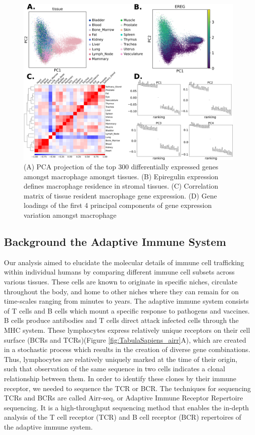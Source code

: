 \begin{figure}[hbt!]
\centering
\includegraphics[width=14cm, keepaspectratio]{figs/TabulaSapiens/fig1_gex_analysis.png}
\caption[Gene Expression Analysis of Tissue Resident Macrophage]{(A) PCA projection of the top 300 differentially expressed genes amongst macrophage amongst tissues. (B) Epiregulin expression defines macrophage residence in stromal tissues. (C) Correlation matrix of tissue resident macrophage gene expression. (D) Gene loadings of the first 4 principal components of gene expression variation amongst macrophage}
\label{fig:TabulaSapiens_gex}
\end{figure}

\subsection{Background the Adaptive Immune System}
Our analysis aimed to elucidate the molecular details of immune cell trafficking within individual humans by comparing different immune cell subsets across various tissues. These cells are known to originate in specific niches, circulate throughout the body, and home to other niches where they can remain for on time-scales ranging from minutes\cite{jerison_heterogeneous_2020} to years\cite{hammarlund_plasma_2017}. The adaptive immune system consists of T cells and B cells which mount a specific response to pathogens and vaccines. B cells produce antibodies and T cells direct attack infected cells through the MHC system. These lymphocytes express relatively unique receptors on their cell surface (BCRs and TCRs)(Figure \ref{fig:TabulaSapiens_airr}A), which are created in a stochastic process which results in the creation of diverse gene combinations\cite{alberts2017molecular}. Thus, lymphocytes are relatively uniquely marked at the time of their origin, such that observation of the same sequence in two cells indicates a clonal relationship between them. In order to identify these clones by their immune receptor, we needed to sequence the TCR or BCR. The techniques for sequencing TCRs and BCRs are called Airr-seq, or Adaptive Immune Receptor Repertoire sequencing. It is a high-throughput sequencing method that enables the in-depth analysis of the T cell receptor (TCR) and B cell receptor (BCR) repertoires of the adaptive immune system. 

